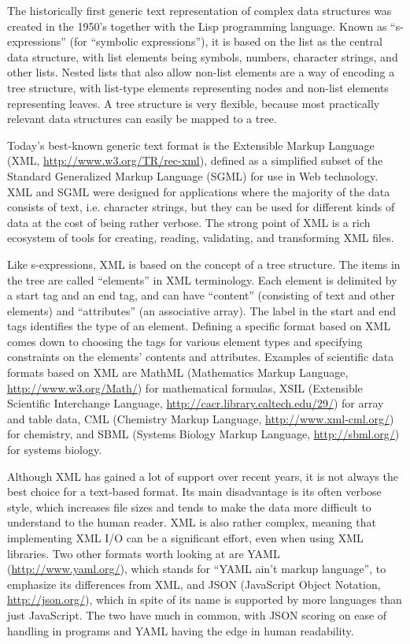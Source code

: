 \documentclass{csmagazine}
\begin{document}
The historically first generic text representation of complex data structures was created in the 1950's together with the Lisp programming language. Known as ``s-expressions'' (for ``symbolic expressions''), it is based on the list as the central data structure, with list elements being symbols, numbers, character strings, and other lists. Nested lists that also allow non-list elements are a way of encoding a tree structure, with list-type elements representing nodes and non-list elements representing leaves. A tree structure is very flexible, because most practically relevant data structures can easily be mapped to a tree.

Today's best-known generic text format is the Extensible Markup Language (XML, \url{http://www.w3.org/TR/rec-xml}), defined as a simplified subset of the Standard Generalized Markup Language (SGML) for use in Web technology. XML and SGML were designed for applications where the majority of the data consists of text, i.e. character strings, but they can be used for different kinds of data at the cost of being rather verbose. The strong point of XML is a rich ecosystem of tools for creating, reading, validating, and transforming XML files.

Like s-expressions, XML is based on the concept of a tree structure. The items in the tree are called ``elements'' in XML terminology. Each element is delimited by a start tag and an end tag, and can have ``content'' (consisting of text and other elements) and ``attributes'' (an associative array). The label in the start and end tags identifies the type of an element. Defining a specific format based on XML comes down to choosing the tags for various element types and specifying constraints on the elements' contents and attributes. Examples of scientific data formats based on XML are MathML (Mathematics Markup Language, \url{http://www.w3.org/Math/}) for mathematical formulas, XSIL (Extensible Scientific Interchange Language, \url{http://cacr.library.caltech.edu/29/}) for array and table data, CML (Chemistry Markup Language, \url{http://www.xml-cml.org/}) for chemistry, and SBML (Systems Biology Markup Language, \url{http://sbml.org/}) for systems biology.

Although XML has gained a lot of support over recent years, it is not always the best choice for a text-based format. Its main disadvantage is its often verbose style, which increases file sizes and tends to make the data more difficult to understand to the human reader. XML is also rather complex, meaning that implementing XML I/O can be a significant effort, even when using XML libraries. Two other formats worth looking at are YAML (\url{http://www.yaml.org/}), which stands for ``YAML ain't markup language'', to emphasize its differences from XML, and JSON (JavaScript Object Notation, \url{http://json.org/}), which in spite of its name is supported by more languages than just JavaScript. The two have much in common, with JSON scoring on ease of handling in programs and YAML having the edge in human readability.
\end{document}

